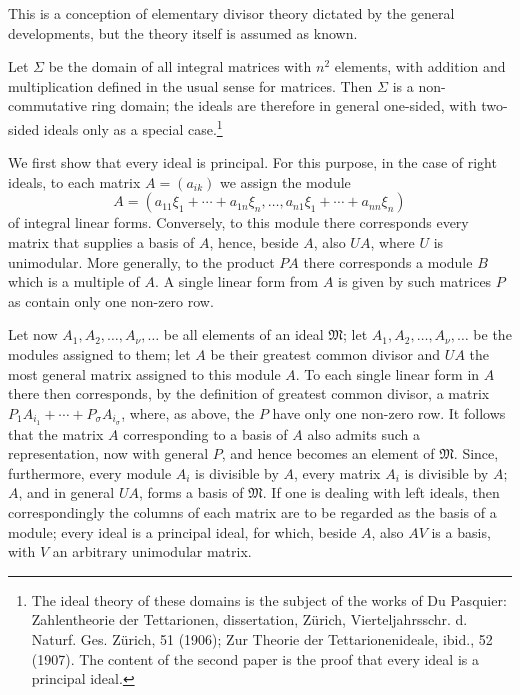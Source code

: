 \documentclass[11pt]{article}
\newcommand{\ideal}[1]{\mathfrak{#1}}
\begin{document}
This is a conception of elementary divisor theory dictated by the general developments, but the theory itself is assumed as known.

Let $\Sigma$ be the domain of all integral matrices with $n^2$ elements, with addition and multiplication defined in the usual sense for matrices. Then $\Sigma$ is a non-commutative ring domain; the ideals are therefore in general one-sided, with two-sided ideals only as a special case.\footnote{The ideal theory of these domains is the subject of the works of Du Pasquier: Zahlentheorie der Tettarionen, dissertation, Zürich, Vierteljahrsschr. d. Naturf. Ges. Zürich, 51 (1906); Zur Theorie der Tettarionenideale, ibid., 52 (1907). The content of the second paper is the proof that every ideal is a principal ideal.}

We first show that every ideal is principal. For this purpose, in the case of right ideals, to each matrix $A=(a_{ik})$ we assign the module
\[
 A=(a_{11}\xi_1+\cdots+a_{1n}\xi_n,
 \ldots,
 a_{n1}\xi_1+\cdots+a_{nn}\xi_n)
\]
of integral linear forms. Conversely, to this module there corresponds every matrix that supplies a basis of $A$, hence, beside $A$, also $UA$, where $U$ is unimodular. More generally, to the product $PA$ there corresponds a module $B$ which is a multiple of $A$. A single linear form from $A$ is given by such matrices $P$ as contain only one non-zero row.

Let now $A_1,A_2,
\ldots,A_\nu,
\ldots$ be all elements of an ideal $\ideal M$; let $A_1,A_2,
\ldots,A_\nu,
\ldots$ be the modules assigned to them; let $A$ be their greatest common divisor and $UA$ the most general matrix assigned to this module $A$. To each single linear form in $A$ there then corresponds, by the definition of greatest common divisor, a matrix $P_1A_{i_1}+\cdots+P_\sigma A_{i_\sigma}$, where, as above, the $P$ have only one non-zero row. It follows that the matrix $A$ corresponding to a basis of $A$ also admits such a representation, now with general $P$, and hence becomes an element of $\ideal M$. Since, furthermore, every module $A_i$ is divisible by $A$, every matrix $A_i$ is divisible by $A$; $A$, and in general $UA$, forms a basis of $\ideal M$. If one is dealing with left ideals, then correspondingly the columns of each matrix are to be regarded as the basis of a module; every ideal is a principal ideal, for which, beside $A$, also $AV$ is a basis, with $V$ an arbitrary unimodular matrix.
\end{document}
